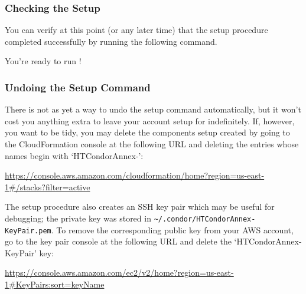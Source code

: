 \subsubsection{Checking the Setup}

You can verify at this point (or any later time) that the setup procedure
completed successfully by running the following command.


You're ready to run !

\subsubsection{Undoing the Setup Command}

There is not as yet a way to undo the setup command automatically, but it
won't cost you anything extra to leave your account setup for 
indefinitely.  If, however, you want to be tidy, you may delete the components
setup created by going to the CloudFormation console at the following URL
and deleting the entries whose names begin with `HTCondorAnnex-':

\url{https://console.aws.amazon.com/cloudformation/home?region=us-east-1#/stacks?filter=active}

The setup procedure also creates an SSH key pair which may be useful
for debugging; the private key was stored in
\texttt{\textasciitilde{}/.condor/HTCondorAnnex-KeyPair.pem}.  To remove the
corresponding public key from your AWS account, go to the key pair console
at the following URL and delete the `HTCondorAnnex-KeyPair' key:

\url{https://console.aws.amazon.com/ec2/v2/home?region=us-east-1#KeyPairs:sort=keyName}

